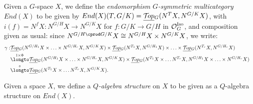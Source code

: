 \documentclass{report}
\newenvironment{renumerate}
{\begin{list}{\roman{enumi}.}
    {\itemsep=0in\usecounter{enumi}}
  }{\end{list}}
\newcommand{\Top}{\text{$\mathcal{T}\!op$}}
\newcommand{\Set}{\text{$\mathcal{S}\!et$}}
\newcommand{\TopG}{\text{\underline{$\Top$}$_G$}}
\newcommand{\SetGI}{\text{$\Set^G_{\mbox{\scriptsize Iso}}$}}
\renewcommand{\O}{\text{$\mathcal{O}$}}
\begin{document}

\begin{example}
  Given a $G$-space $X$, we define the {\em endomorphism $G$-symmetric multicategory} $End(X)$ to be given by $End(X)(T,G/K) = \TopG(N^TX, N^{G/K}X)$, with $i(f) = N^fX: N^{G/H}X\to N^{G/K}X$ for $f: G/K\to G/H$ in $\OGI$, and composition given as usual: since $N^{G/H\cprod G/K}X \cong N^{G/H}X\times N^{G/K}X$, we write:
\begin{align*}
  \gamma: &\TopG(N^{G/H_1}X\times\ldots\times N^{G/H_r}X,N^{G/K}X)\times \TopG(N^{T_1}X,N^{G/H_1}X)\times\ldots\times \TopG(N^{T_r}X,N^{G/H_r}X)\\
  &\overset{1\times \Phi}{\longto}\TopG(N^{G/H_1}X\times\ldots\times N^{G/H_r}X,N^{G/K}X)\times\TopG(N^{T_1}X\times\ldots N^{T_r}X, N^{G/H_1}X\times\ldots\times N^{G/H_r}X)\\
  &\overset{\circ}{\longto} \TopG(N^{T_1}X\times\ldots N^{T_r}X, N^{G/K}X).
\end{align*}
\end{example}
\begin{defn}
  Given a space $X$, we define a {\em $Q$-algebra structure} on $X$ to be given as a $Q$-algebra structure on $End(X)$. 
\end{defn}
\end{document}
